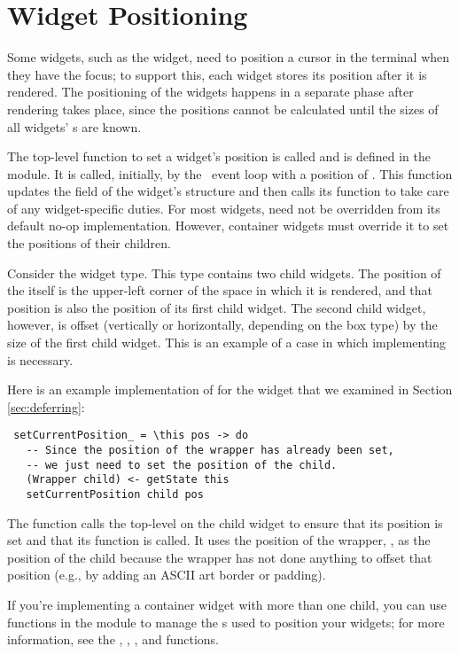 \section{Widget Positioning}

Some widgets, such as the  widget, need to position a cursor
in the terminal when they have the focus; to support this, each widget
stores its position after it is rendered.  The positioning of the
widgets happens in a separate phase after rendering takes place, since
the positions cannot be calculated until the sizes of all widgets'
s are known.

The top-level function to set a widget's position is called
 and is defined in the  module.  It is
called, initially, by the \vtyui\ event loop with a position of
.  This function updates the  field of
the widget's  structure and then calls its
 function to take care of any widget-specific
duties.  For most widgets,  need not be
overridden from its default no-op implementation.  However, container
widgets must override it to set the positions of their children.

Consider the  widget type.  This type contains two child
widgets.  The position of the  itself is the upper-left corner
of the space in which it is rendered, and that position is also the
position of its first child widget.  The second child widget, however,
is offset (vertically or horizontally, depending on the box type) by
the size of the first child widget.  This is an example of a case in
which implementing  is necessary.

Here is an example implementation of  for the
 widget that we examined in Section \ref{sec:deferring}:

\begin{verbatim}
 setCurrentPosition_ = \this pos -> do
   -- Since the position of the wrapper has already been set,
   -- we just need to set the position of the child.
   (Wrapper child) <- getState this
   setCurrentPosition child pos
\end{verbatim}

The function calls the top-level  on the child
widget to ensure that its position is set and that its
 function is called.  It uses the position of
the wrapper, , as the position of the child because the
wrapper has not done anything to offset that position (e.g., by adding
an ASCII art border or padding).

If you're implementing a container widget with more than one child,
you can use functions in the  module to manage the
s used to position your widgets; for more
information, see the , , ,
and  functions.
